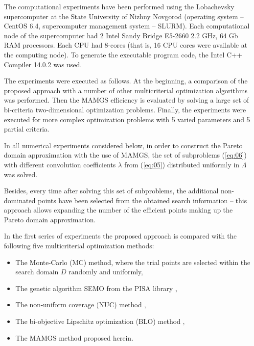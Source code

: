 \documentclass[smallcondensed]{svjour3}     %
\begin{document}
The computational experiments have been performed using the Lobachevsky supercomputer at the State University of Nizhny Novgorod (operating system -- CentOS 6.4, supercomputer management system -- SLURM). Each computational node of the supercomputer had 2 Intel Sandy Bridge E5-2660 2.2 GHz, 64 Gb RAM processors. Each CPU had 8-cores (that is, 16 CPU cores were available at the computing node). To generate the executable program code, the Intel C++ Compiler 14.0.2 was used.\par

The experiments were executed as follows. At the beginning, a comparison of the proposed approach with a number of other multicriterial optimization algorithms was performed. Then the MAMGS efficiency is evaluated by solving a large set of bi-criteria two-dimensional optimization problems. Finally, the experiments were executed for more complex optimization problems with 5 varied parameters and 5 partial criteria.\par

In all numerical experiments considered below, in order to construct the Pareto domain approximation with the use of MAMGS, the set of subproblems (\ref{eq:06}) with different convolution coefficients $\lambda$ from (\ref{eq:05}) distributed uniformly in $\Lambda$ was solved. \par

Besides, every time after solving this set of subproblems, the additional non-dominated points have been selected from the obtained search information -- this approach allows expanding the number of the efficient points making up the Pareto domain approximation. \par

In the first series of experiments the proposed approach is compared with the following five multicriterial optimization methods:
\begin{itemize}
	\item The Monte-Carlo (MC) method, where the trial points are selected within the search domain $D$ randomly and uniformly,
	\item The genetic algorithm SEMO from the PISA library \cite{c4,c10},
	\item The non-uniform coverage (NUC) method \cite{c10},
	\item The bi-objective Lipschitz optimization (BLO) method \cite{c45},
	\item The MAMGS method proposed herein.
\end{itemize}
	
\end{document}
